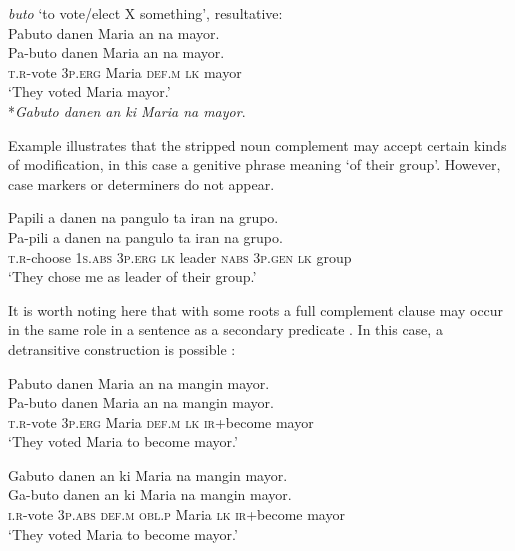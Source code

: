 \ea
\textit{buto} ‘to vote/elect X something’, resultative: \\
Pabuto	danen	Maria	an	na	mayor. \\\smallskip
\gll Pa-buto	danen	Maria	an	na	mayor. \\
\textsc{t.r}-vote	3\textsc{p.erg}	Maria	\textsc{def.m}	\textsc{lk}	mayor \\
\glt ‘They voted Maria mayor.’ \\\smallskip
*\textit{Gabuto danen an ki Maria na mayor}.
\z

Example  illustrates that the stripped noun complement may accept certain kinds of modification, in this case a genitive phrase meaning ‘of their group’. However, case markers or determiners do not appear.

\ea
\label{ex:leaderoftheirgroup}
Papili	a	danen	na	pangulo	ta	iran	na	grupo. \\\smallskip
\gll Pa-pili	a	danen	na	pangulo	ta	iran	na	grupo. \\
\textsc{t.r}-choose	1\textsc{s.abs}	3\textsc{p.erg}	\textsc{lk}	leader	\textsc{nabs}	3\textsc{p.gen}	\textsc{lk}	group \\
\glt ‘They chose me as leader of their group.’
\z

It is worth noting here that with some roots a full complement clause may occur in the same role in a sentence as a secondary predicate . In this case, a detransitive construction is possible :  

\ea
\label{ex:tobecomemayor-1}
Pabuto	danen	Maria	an	na	mangin 	mayor. \\\smallskip
\gll Pa-buto	danen	Maria	an	na	mangin 	mayor. \\
\textsc{t.r}-vote	3\textsc{p.erg}	Maria	\textsc{def.m}	\textsc{lk}	\textsc{ir}+become\footnotemark{}	mayor \\
\glt ‘They voted Maria to become mayor.’
\z

\ea
\label{ex:tobecomemayor-2}
Gabuto	danen	an	ki	Maria	na	mangin	mayor. \\\smallskip
\gll Ga-buto	danen	an	ki	Maria	na	mangin	mayor. \\
\textsc{i.r}-vote	3\textsc{p.abs}	\textsc{def.m}	\textsc{obl.p}	Maria	\textsc{lk}	\textsc{ir}+become	mayor \\
\glt ‘They voted Maria to become mayor.’
\z

